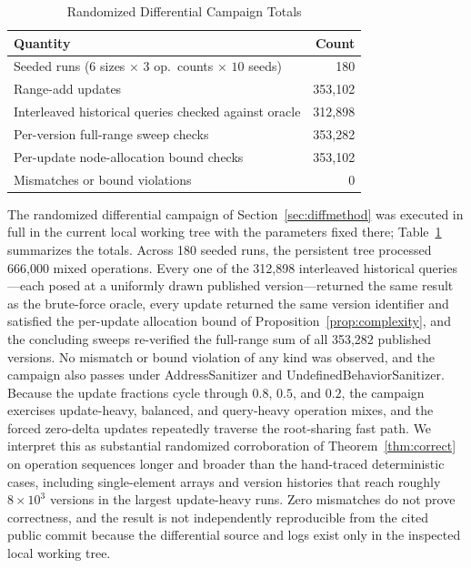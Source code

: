 \documentclass[conference]{IEEEtran}
\begin{document}
\begin{table}[!t]
\caption{Randomized Differential Campaign Totals}
\label{tab:differential}
\centering
\footnotesize
\renewcommand{\arraystretch}{1.25}
\begin{tabular}{@{}lr@{}}
\toprule
\textbf{Quantity} & \textbf{Count} \\
\midrule
Seeded runs ($6$ sizes $\times$ $3$ op.\ counts $\times$ $10$ seeds) & 180 \\
Range-add updates & 353{,}102 \\
Interleaved historical queries checked against oracle & 312{,}898 \\
Per-version full-range sweep checks & 353{,}282 \\
Per-update node-allocation bound checks & 353{,}102 \\
Mismatches or bound violations & 0 \\
\bottomrule
\end{tabular}
\end{table}

The randomized differential campaign of Section~\ref{sec:diffmethod} was executed in full
in the current local working tree with the parameters fixed there;
Table~\ref{tab:differential} summarizes the totals. Across 180 seeded runs, the persistent tree processed 666{,}000 mixed operations. Every
one of the 312{,}898 interleaved historical queries---each posed at a uniformly drawn published
version---returned the same result as the brute-force oracle, every update returned the same
version identifier and satisfied the per-update allocation bound of
Proposition~\ref{prop:complexity}, and the concluding sweeps re-verified the full-range sum of
all 353{,}282 published versions. No mismatch or bound violation of any kind was observed, and
the campaign also passes under AddressSanitizer and UndefinedBehaviorSanitizer. Because the update fractions cycle through
$0.8$, $0.5$, and $0.2$, the campaign exercises update-heavy, balanced, and query-heavy
operation mixes, and the forced zero-delta updates repeatedly traverse the
root-sharing fast path. We interpret this as substantial randomized corroboration of
Theorem~\ref{thm:correct} on operation sequences longer and broader than the
hand-traced deterministic cases, including single-element arrays and version histories that
reach roughly $8 \times 10^3$ versions in the largest update-heavy runs. Zero mismatches do not
prove correctness, and the result is not independently reproducible from the cited public commit
because the differential source and logs exist only in the inspected local working tree.
\end{document}
